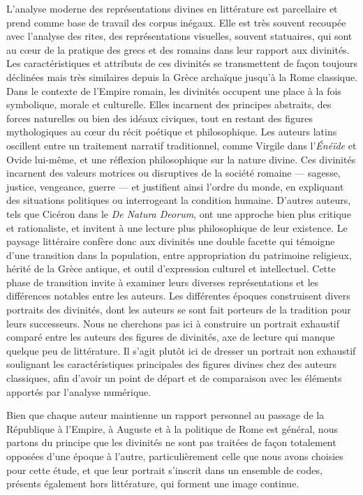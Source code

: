 \documentclass[
  letterpaper,
  DIV=11,
  numbers=noendperiod]{scrreprt}
\begin{document}
L'analyse moderne des représentations divines en littérature est
parcellaire et prend comme base de travail des corpus inégaux. Elle est
très souvent recoupée avec l'analyse des rites, des représentations
visuelles, souvent statuaires, qui sont au cœur de la pratique des grecs
et des romains dans leur rapport aux divinités. Les caractéristiques et
attributs de ces divinités se transmettent de façon toujours déclinées
mais très similaires depuis la Grèce archaïque jusqu'à la Rome
classique. Dans le contexte de l'Empire romain, les divinités occupent
une place à la fois symbolique, morale et culturelle. Elles incarnent
des principes abstraits, des forces naturelles ou bien des idéaux
civiques, tout en restant des figures mythologiques au cœur du récit
poétique et philosophique. Les auteurs latins oscillent entre un
traitement narratif traditionnel, comme Virgile dans l'\emph{Énéïde} et
Ovide lui-même, et une réflexion philosophique sur la nature divine. Ces
divinités incarnent des valeurs motrices ou disruptives de la société
romaine --- sagesse, justice, vengeance, guerre --- et justifient ainsi
l'ordre du monde, en expliquant des situations politiques ou
interrogeant la condition humaine. D'autres auteurs, tels que Cicéron
dans le \emph{De Natura Deorum}, ont une approche bien plus critique et
rationaliste, et invitent à une lecture plus philosophique de leur
existence. Le paysage littéraire confère donc aux divinités une double
facette qui témoigne d'une transition dans la population, entre
appropriation du patrimoine religieux, hérité de la Grèce antique, et
outil d'expression culturel et intellectuel. Cette phase de transition
invite à examiner leurs diverses représentations et les différences
notables entre les auteurs. Les différentes époques construisent divers
portraits des divinités, dont les auteurs se sont fait porteurs de la
tradition pour leurs successeurs. Nous ne cherchons pas ici à construire
un portrait exhaustif comparé entre les auteurs des figures de
divinités, axe de lecture qui manque quelque peu de littérature. Il
s'agit plutôt ici de dresser un portrait non exhaustif soulignant les
caractéristiques principales des figures divines chez des auteurs
classiques, afin d'avoir un point de départ et de comparaison avec les
éléments apportés par l'analyse numérique.

Bien que chaque auteur maintienne un rapport personnel au passage de la
République à l'Empire, à Auguste et à la politique de Rome est général,
nous partons du principe que les divinités ne sont pas traitées de façon
totalement opposées d'une époque à l'autre, particulièrement celle que
nous avons choisies pour cette étude, et que leur portrait s'inscrit
dans un ensemble de codes, présents également hors littérature, qui
forment une image continue.
\end{document}
